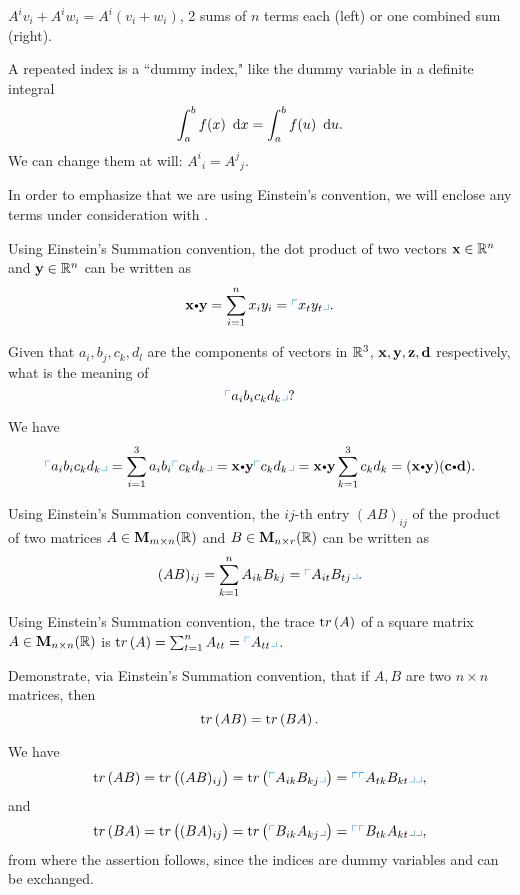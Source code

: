 $A^i v_i + A^i w_i = A^i(v_i+w_i)$, 
 2 sums of $n$ terms each (left) or one combined sum (right).
\medskip

A repeated index is a ``dummy index," like the dummy variable in a definite integral
\[\dint^b_a f(x)\dx=\dint^b_a f(u)\du.\]		
We can change them at will: $A^i{}_i=A^j{}_j$.



\begin{rem}
In order to emphasize that we are using Einstein's convention, we
will enclose any terms under consideration with \es{\cdot}.
\end{rem}
\begin{exa}
Using Einstein's Summation convention, the dot product of two
vectors $\mathbf{ x}\in\mathbb{R}^n$ and $\mathbf{ y}\in\mathbb{R}^n$ can be
written as
$$ \dotprod{x}{y} =\sum _{i=1} ^n x_iy_i = \es{x_ty_t}.$$
\end{exa}
\begin{exa}
Given that $a_i, b_j, c_k, d_l$ are the components of vectors in
$\mathbb{R}^3$, $\mathbf{ x}, \mathbf{ y},  \mathbf{ z}, \mathbf{ d}$
respectively, what is the meaning of $$\es{a_ib_ic_kd_k} ?
$$
\end{exa}
\begin{solu}
We have
$$\es{a_ib_ic_kd_k}  = \sum _{i=1} ^3 a_ib_i\es{c_kd_k} = \dotprod{x}{y}\es{c_kd_k} = \dotprod{x}{y}\sum _{k=1} ^3 c_kd_k = (\dotprod{x}{y})(\dotprod{c}{d}).  $$
\end{solu}

\begin{exa}
Using Einstein's Summation convention, the  $ij$-th entry
$(AB)_{ij}$ of the product of two matrices $A\in{\mathbf M}_{m\times
n}(\mathbb{R})$ and $B\in{\mathbf M}_{n\times r}(\mathbb{R})$ can be written as
$$ (AB)_{ij} = \sum _{k=1} ^n A_{ik}B_{kj}=    \es{A_{it}B_{tj}}.$$
\end{exa}
\begin{exa}
Using Einstein's Summation convention, the trace ${\mathrm tr}\left(A\right)$ of a
square matrix $A\in{\mathbf M}_{n\times n}(\mathbb{R})$  is  $\tr{A}= \sum
_{t=1} ^n A_{tt}=\es{A_{tt}}$.
\end{exa}
\begin{exa}
Demonstrate, via Einstein's Summation convention, that if $A, B$ are
two $n\times n$ matrices, then $$ {\mathrm tr}\left(AB\right)={\mathrm tr}\left(BA\right). $$
\end{exa}
\begin{solu}
We have
$$ \tr{AB}  = \tr{(AB)_{ij}}=\tr{\es{A_{ik}B_{kj}}} =\es{\es{A_{tk}B_{kt}}},  $$
and
$$ \tr{BA}  = \tr{(BA)_{ij}}=\tr{\es{B_{ik}A_{kj}}} =\es{\es{B_{tk}A_{kt}}}, $$
from where the assertion follows, since the indices are dummy
variables and can be exchanged.
\end{solu}

